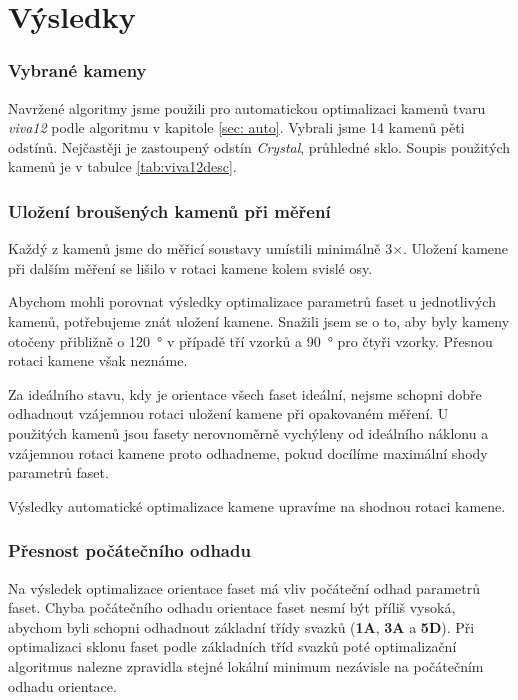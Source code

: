   
\part{Výsledky}

\section{Vybrané kameny}

Navržené algoritmy jsme použili pro automatickou optimalizaci kamenů tvaru \textit{viva12} podle algoritmu v kapitole \ref{sec: auto}. Vybrali jsme 14 kamenů pěti odstínů. Nejčastěji je zastoupený odstín \textit{Crystal}, průhledné sklo. Soupis použitých kamenů je v tabulce \ref{tab:viva12desc}. 

\section{Uložení broušených kamenů při měření}

 	Každý z kamenů jsme do měřicí soustavy umístili minimálně 3$\times$. Uložení kamene při dalším měření se lišilo v rotaci kamene kolem svislé osy.

	Abychom mohli porovnat výsledky optimalizace parametrů faset u jednotlivých kamenů, potřebujeme znát uložení kamene. Snažili jsem se o to, aby byly kameny otočeny přibližně o \SI{120}{\degree} v případě tří vzorků a \SI{90}{\degree} pro čtyři vzorky. Přesnou rotaci kamene však neznáme.
	
	Za ideálního stavu, kdy je orientace všech faset ideální, nejsme schopni dobře odhadnout vzájemnou rotaci uložení kamene při opakovaném měření. U použitých kamenů jsou fasety nerovnoměrně vychýleny od ideálního náklonu a vzájemnou rotaci kamene proto odhadneme, pokud docílíme maximální shody parametrů faset.   
	
	Výsledky automatické optimalizace kamene upravíme na shodnou rotaci kamene. 
	
\section{Přesnost počátečního odhadu}
	
	Na výsledek optimalizace orientace faset má vliv počáteční odhad parametrů faset. Chyba počátečního odhadu orientace faset nesmí být příliš vysoká, abychom byli schopni odhadnout základní třídy svazků (\textbf{1A}, \textbf{3A} a \textbf{5D}). Při optimalizaci sklonu faset podle základních tříd svazků poté optimalizační algoritmus nalezne zpravidla stejné lokální minimum nezávisle na počátečním odhadu orientace. 
	

